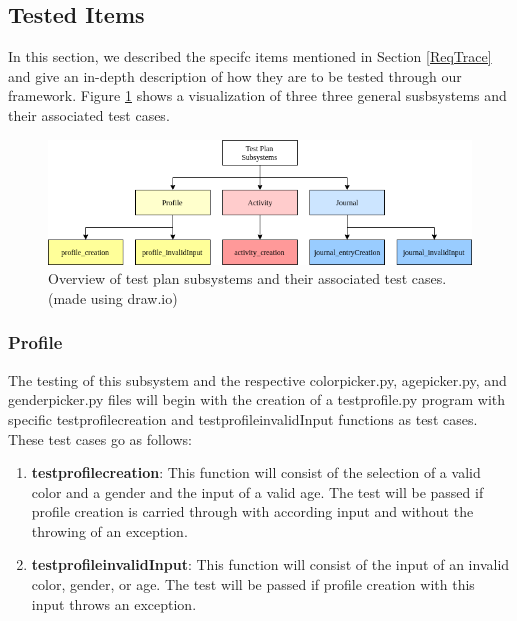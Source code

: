\documentclass{article}
\begin{document}
\subsection{Tested Items}
In this section, we described the specifc items mentioned in Section \ref{ReqTrace} and give an in-depth description of how they are to be tested through our framework. Figure \ref{Figure2} shows a visualization of three three general susbsystems and their associated test cases.
\begin{figure}
\centering
\includegraphics[scale=0.5]{../imgs/Figure2.png}
\caption{Overview of test plan subsystems and their associated test cases. (made using draw.io)}
\label{Figure2}
\end{figure}
\subsubsection{Profile}
The testing of this subsystem and the respective colorpicker.py, agepicker.py, and genderpicker.py files will begin with the creation of a test\textunderscore profile.py program with specific test\textunderscore profile\textunderscore creation and test\textunderscore profile\textunderscore invalidInput functions as test cases. These test cases go as follows:
\begin{enumerate}
\itemsep-0.5em
\item \textbf{test\textunderscore profile\textunderscore creation}: This function will consist of the selection of a valid color and a gender and the input of a valid age. The test will be passed if profile creation is carried through with according input and without the throwing of an exception.
\item \textbf{test\textunderscore profile\textunderscore invalidInput}: This function will consist of the input of an invalid color, gender, or age. The test will be passed if profile creation with this input throws an exception.
\end{enumerate}
\end{document}
